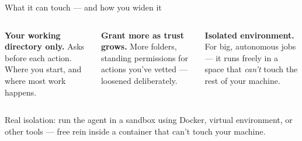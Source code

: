 \documentclass[aspectratio=169, 10pt]{beamer}
\begin{document}
\begin{frame}{What it can touch --- and how you widen it}
\vskip2pt
\begin{columns}[T,onlytextwidth]
\begin{column}{0.32\textwidth}
\begin{tcolorbox}[colback=PaleSage, colframe=SlateTeal, boxrule=0.9pt, arc=3pt, left=5pt, right=5pt, top=3pt, bottom=3pt, title={\faFolderOpen\quad 1. Default}, fonttitle=\bfseries\small\color{white}, coltitle=white, colbacktitle=SlateTeal]
\footnotesize
\textbf{Your working directory only.}
\vskip2pt
Asks before each action. Where you start, and where most work happens.
\end{tcolorbox}
\end{column}
\begin{column}{0.32\textwidth}
\begin{tcolorbox}[colback=LightGold, colframe=UVMGold, boxrule=0.9pt, arc=3pt, left=5pt, right=5pt, top=3pt, bottom=3pt, title={\faKey\quad 2. Widen}, fonttitle=\bfseries\small\color{white}, coltitle=white, colbacktitle=UVMGold]
\footnotesize
\textbf{Grant more as trust grows.}
\vskip2pt
More folders, standing permissions for actions you've vetted --- loosened deliberately.
\end{tcolorbox}
\end{column}
\begin{column}{0.32\textwidth}
\begin{tcolorbox}[colback=PaleSage, colframe=CoolGray, boxrule=0.9pt, arc=3pt, left=5pt, right=5pt, top=3pt, bottom=3pt, title={\faServer\quad 3. Sandbox / VM}, fonttitle=\bfseries\small\color{white}, coltitle=white, colbacktitle=CoolGray]
\footnotesize
\textbf{Isolated environment.}
\vskip2pt
For big, autonomous jobs --- it runs freely in a space that \emph{can't} touch the rest of your machine.
\end{tcolorbox}
\end{column}
\end{columns}
\vfill
\begin{tcolorbox}[accentbox, top=2pt, bottom=2pt]
\scriptsize Real isolation: run the agent in a sandbox using Docker, virtual environment, or other tools --- free rein inside a container that can't touch your machine.
\end{tcolorbox}
\end{frame}

\end{document}
